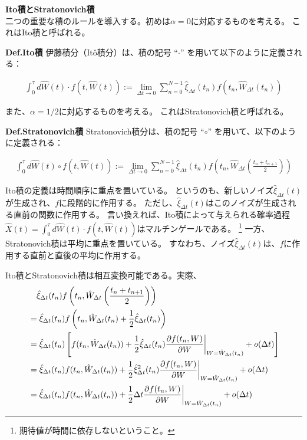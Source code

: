 \documentclass[a4paper,11pt]{jsarticle}
\numberwithin{equation}{section}
\begin{document}
\textbf{Ito積とStratonovich積}\\
二つの重要な積のルールを導入する。初めは$\alpha = 0$に対応するものを考える。
これはIto積と呼ばれる。
\begin{itembox}[l]{\textbf{Def.Ito積}}
    伊藤積分（Itô積分）は、積の記号 “\(\cdot\)” を用いて以下のように定義される：

\begin{align}
\int_0^\tau d\hat{W}(t) \cdot f(t, \hat{W}(t)) := \lim_{\Delta t \to 0} \sum_{n=0}^{N-1} \hat{\xi}_{\Delta t}(t_n) f(t_n, \hat{W}_{\Delta t}(t_n))
\end{align}
\end{itembox}
また、$\alpha =1/2$に対応するものを考える。
これはStratonovich積と呼ばれる。
\begin{itembox}[l]{\textbf{Def.Stratonovich積}}
    Stratonovich積分は、積の記号 “\(\circ\)” を用いて、以下のように定義される：

\begin{align}
\int_0^\tau d\hat{W}(t) \circ f(t, \hat{W}(t)) := \lim_{\Delta t \to 0} \sum_{n=0}^{N-1} \hat{\xi}_{\Delta t}(t_n) f\left( t_n, \hat{W}_{\Delta t} \left( \frac{t_n + t_{n+1}}{2} \right) \right)
\end{align}
\end{itembox}
Ito積の定義は時間順序に重点を置いている。
というのも、新しいノイズ$\hat{\xi}_{\Delta t}(t)$が生成され、$f$に段階的に作用する。
ただし、$\hat{\xi}_{\Delta t}(t)$はこのノイズが生成される直前の関数に作用する。
言い換えれば、Ito積によって与えられる確率過程$\hat{X}(t) = \int_{0}^{\tau} d\hat{W}(t) \cdot f(t, \hat{W}(t))$はマルチンゲールである。
\footnote{期待値が時間に依存しないということ。}
一方、Stratonovich積は平均に重点を置いている。
すなわち、ノイズ$\hat{\xi}_{\Delta t}(t)$は、$f$に作用する直前と直後の平均に作用する。

Ito積とStratonovich積は相互変換可能である。実際、
\begin{align}
&\quad \hat{\xi}_{\Delta t}(t_n) f\left( t_n, \hat{W}_{\Delta t} \left( \frac{t_n + t_{n+1}}{2} \right) \right)\\
&= \hat{\xi}_{\Delta t}(t_n) f\left( t_n, \hat{W}_{\Delta t}(t_n) + \frac{1}{2} \hat{\xi}_{\Delta t}(t_n) \right) \\
&= \hat{\xi}_{\Delta t}(t_n) \left[ f(t_n, \hat{W}_{\Delta t}(t_n)) + \frac{1}{2} \hat{\xi}_{\Delta t}(t_n) \pdv{f(t_n, W)}{W} \biggr|_{W = \hat{W}_{\Delta t}(t_n)} + o(\Delta t) \right] \\
&= \hat{\xi}_{\Delta t}(t_n) f(t_n, \hat{W}_{\Delta t}(t_n)) + \frac{1}{2} \hat{\xi}_{\Delta t}^2(t_n) \pdv{f(t_n, W)}{W} \biggr|_{W = \hat{W}_{\Delta t}(t_n)} + o(\Delta t) \\
&= \hat{\xi}_{\Delta t}(t_n) f(t_n, \hat{W}_{\Delta t}(t_n)) + \frac{1}{2} \Delta t \pdv{f(t_n, W)}{W} \biggr|_{W = \hat{W}_{\Delta t}(t_n)} + o(\Delta t)
\end{align}
\end{document}
